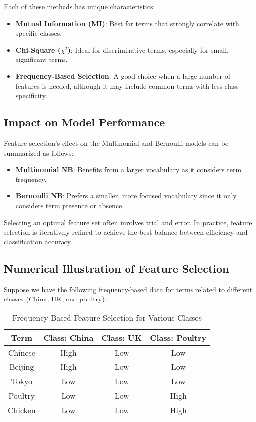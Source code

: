 \documentclass{article}
\begin{document}
Each of these methods has unique characteristics:
\begin{itemize}
    \item \textbf{Mutual Information (MI)}: Best for terms that strongly correlate with specific classes.
    \item \textbf{Chi-Square ($\chi^2$)}: Ideal for discriminative terms, especially for small, significant terms.
    \item \textbf{Frequency-Based Selection}: A good choice when a large number of features is needed, although it may include common terms with less class specificity.
\end{itemize}

\subsection*{Impact on Model Performance}

Feature selection’s effect on the Multinomial and Bernoulli models can be summarized as follows:
\begin{itemize}
    \item \textbf{Multinomial NB}: Benefits from a larger vocabulary as it considers term frequency.
    \item \textbf{Bernoulli NB}: Prefers a smaller, more focused vocabulary since it only considers term presence or absence.
\end{itemize}

Selecting an optimal feature set often involves trial and error. In practice, feature selection is iteratively refined to achieve the best balance between efficiency and classification accuracy.

\subsection*{Numerical Illustration of Feature Selection}

Suppose we have the following frequency-based data for terms related to different classes (China, UK, and poultry):

\begin{table}[h]
    \centering
    \begin{tabular}{|c|c|c|c|}
        \hline
        \textbf{Term} & \textbf{Class: China} & \textbf{Class: UK} & \textbf{Class: Poultry} \\
        \hline
        Chinese & High & Low & Low \\
        Beijing & High & Low & Low \\
        Tokyo & Low & Low & Low \\
        Poultry & Low & Low & High \\
        Chicken & Low & Low & High \\
        \hline
    \end{tabular}
    \caption{Frequency-Based Feature Selection for Various Classes}
\end{table}
\end{document}
